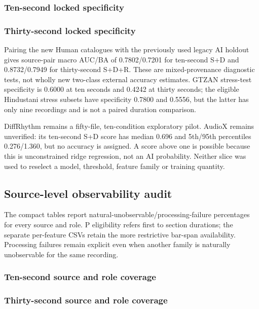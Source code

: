 \subsubsection{Ten-second locked specificity}
\begingroup\fontsize{9.5}{11.5}\selectfont\setlength{\tabcolsep}{4pt}

\endgroup
\clearpage
\subsubsection{Thirty-second locked specificity}
\begingroup\fontsize{9.5}{11.5}\selectfont\setlength{\tabcolsep}{4pt}

\endgroup

Pairing the new Human catalogues with the previously used legacy AI holdout
gives source-pair macro AUC/BA of 0.7802/0.7201 for ten-second S+D and
0.8732/0.7949 for thirty-second S+D+R. These are mixed-provenance diagnostic
tests, not wholly new two-class external accuracy estimates. GTZAN stress-test
specificity is 0.6000 at ten seconds and 0.4242 at thirty seconds; the eligible
Hindustani stress subsets have specificity 0.7800 and 0.5556, but the latter has
only nine recordings and is not a paired duration comparison.

DiffRhythm remains a fifty-file, ten-condition exploratory pilot. AudioX remains
unverified: its ten-second S+D score has median 0.696 and 5th/95th percentiles
0.276/1.360, but no accuracy is assigned. A score above one is possible because
this is unconstrained ridge regression, not an AI probability. Neither slice
was used to reselect a model, threshold, feature family or training quantity.

\subsection{Source-level observability audit}

The compact tables report natural-unobservable/processing-failure percentages
for every source and role. P eligibility refers first to section durations;
the separate per-feature CSVs retain the more restrictive bar-span availability.
Processing failures remain explicit even when another family is naturally
unobservable for the same recording.
\subsubsection{Ten-second source and role coverage}
\begingroup\small\setlength{\tabcolsep}{3pt}

\endgroup
\subsubsection{Thirty-second source and role coverage}
\begingroup\small\setlength{\tabcolsep}{3pt}

\endgroup


